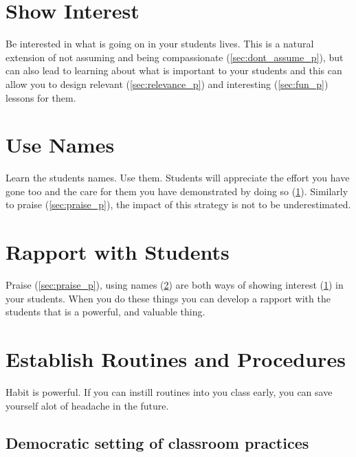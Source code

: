 \documentclass[12pt]{report}
\begin{document}
\section{Show Interest}
\label{sec:show_interest_p}

Be interested in what is going on in your students lives. This is a natural extension of not assuming and being compassionate (\ref{sec:dont_assume_p}), but can also lead to learning about what is important to your students and this can allow you to design relevant (\ref{sec:relevance_p}) and interesting (\ref{sec:fun_p}) lessons for them.



\section{Use Names}
\label{sec:use_names_p}

Learn the students names. Use them. Students will appreciate the effort you have gone too and the care for them you have demonstrated by doing so (\ref{sec:show_interest_p}). Similarly to praise (\ref{sec:praise_p}), the impact of this strategy is not to be underestimated.



\section{Rapport with Students}
\label{sec:rapport_p}

Praise (\ref{sec:praise_p}), using names (\ref{sec:use_names_p}) are both ways of showing interest (\ref{sec:show_interest_p}) in your students. When you do these things you can develop a rapport with the students that is a powerful, and valuable thing.



\section{Establish Routines and Procedures}
\label{sec:routines_p}

Habit is powerful. If you can instill routines into you class early, you can save yourself alot of headache in the future.

\subsection{Democratic setting of classroom practices}
\label{sec:democratic_setting_of_routines_p}
\end{document}
